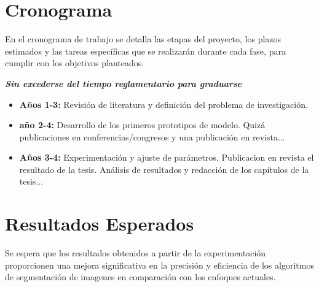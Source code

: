 \documentclass[a4paper,12pt]{article}
\begin{document}
\newpage


\section{Cronograma}
En el cronograma de trabajo se detalla las etapas del proyecto, los plazos estimados y las tareas específicas que se realizarán durante cada fase, para cumplir con los objetivos planteados.

\textbf{\emph{Sin excederse del tiempo reglamentario para graduarse}}


\begin{itemize}
	\item \textbf{Años 1-3:} Revisión de literatura y definición del problema de investigación.
	\item \textbf{año 2-4:} Desarrollo de los primeros prototipos de modelo. Quizá publicaciones en conferencias/congresos y una publicación en revista...
	\item \textbf{Años 3-4:} Experimentación y ajuste de parámetros. Publicacion en revista el resultado de la tesis.
	      Análisis de resultados y redacción de los capítulos de la tesis...
\end{itemize}

\newpage

\section{Resultados Esperados}
Se espera que los resultados obtenidos a partir de la experimentación proporcionen una mejora significativa en la precisión y eficiencia de los algoritmos de segmentación de imagenes en comparación con los enfoques actuales.\cite{referencia2}

\newpage

\section*{}

%			
%			

\newpage
\end{document}
